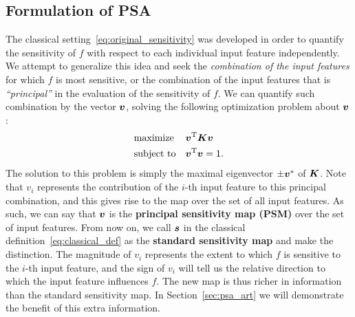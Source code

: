 \subsection{Formulation of PSA}
%
The classical setting~\eqref{eq:original_sensitivity} was developed
in order to quantify the sensitivity of $f$ with respect
to each individual input feature independently.
%
We attempt to generalize this idea and seek the \textit{combination
of the input features} for which $f$ is most sensitive, or the combination of the input features that is
\textit{``principal''} in the evaluation of the sensitivity of $f$.
%
We can quantify such combination by the vector $\mbox{\boldmath $v$}$, solving the following
optimization problem about $\mbox{\boldmath $v$}$:
%
\begin{align}
  \begin{split}
\begin{aligned}
& \text{maximize}
& & \mbox{\boldmath $v$}^{\mathrm{T}} \mbox{\boldmath $K$} \mbox{\boldmath $v$} \\
& \text{subject to}
& & \mbox{\boldmath $v$}^{\mathrm{T}}\mbox{\boldmath $v$} = 1.
\end{aligned}
 \end{split} \label{def:psm}
\end{align}
%
The solution to this problem is simply the maximal eigenvector
$\pm\mbox{\boldmath $v$}^{*}$ of $\mbox{\boldmath $K$}$.
%
Note that $v_i$ represents the contribution of the $i$-th input feature to this principal
combination, and this gives rise to the map over the set of all input features.
As such, we can say that $\mbox{\boldmath $v$}$ is the \textbf{principal sensitivity map
(PSM)} over the set of input features.
%
From now on, we call $\mbox{\boldmath $s$}$ in the classical definition~\eqref{eq:classical_def} as the \textbf{standard sensitivity map} and
make the distinction.
%
The magnitude of $v_i$ represents the extent
to which $f$ is sensitive to the $i$-th input feature,
and the sign of $v_i$ will tell us the relative direction
to which the input feature influences $f$.
%
The new map is thus richer in information than the standard
sensitivity map.
%
In Section~\ref{sec:psa_art} we will demonstrate the benefit of this extra
information.

